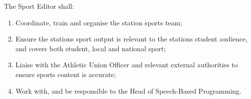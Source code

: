 \item The Sport Editor shall:
\begin{enumerate}[label*=\arabic*.]
    \item Coordinate, train and organise the station sports team;
    \item Ensure the stations sport output is relevant to the stations student audience, and covers both student, local and national sport;
    \item Liaise with the Athletic Union Officer and relevant external authorities to ensure sports content is accurate;
    \item Work with, and be responsible to the Head of Speech-Based Programming.
\end{enumerate}

